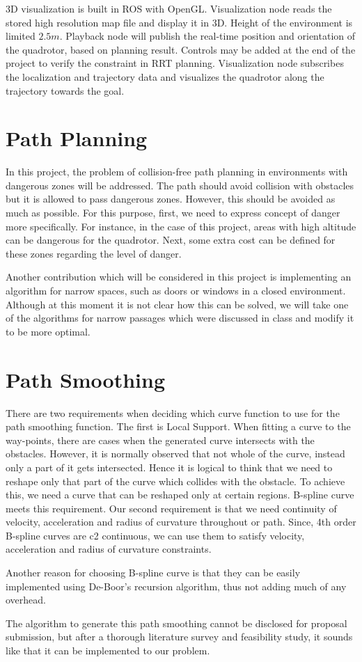 \documentclass[dvips,12pt]{article}
\begin{document}
3D visualization is built in ROS with OpenGL. Visualization node reads the stored high resolution map file and display it in 3D. Height of the environment is limited $2.5m$. Playback node will publish the real-time position and orientation of the quadrotor, based on planning result. Controls may be added at the end of the project to verify the constraint in RRT planning. Visualization node subscribes the localization and trajectory data and visualizes the quadrotor along the trajectory towards the goal.

\section{Path Planning}
In this project, the problem of collision-free path planning in environments with dangerous zones will be addressed. The path should avoid collision with obstacles but it is allowed to pass dangerous zones. However, this should be avoided as much as possible. For this purpose, first, we need to express concept of danger more specifically. For instance, in the case of this project, areas with high altitude can be dangerous for the quadrotor.  Next, some extra cost can be defined for these zones regarding the level of danger.

Another contribution which will be considered in this project is implementing an algorithm for narrow spaces, such as doors or windows in a closed environment. Although at this moment it is not clear how this can be solved, we will take one of the algorithms for narrow passages which were discussed in class and modify it to be more optimal.


\section{Path Smoothing}

There are two requirements when deciding which curve function to use for the path smoothing function. The first is Local Support. When fitting a curve to the way-points, there are cases when the generated curve intersects with the obstacles. However, it is normally observed that not whole of the curve, instead only a part of it gets intersected. Hence it is logical to think that we need to reshape only that part of the curve which collides with the obstacle. To achieve this, we need a curve that can be reshaped only at certain regions. B-spline curve meets this requirement. Our second requirement is that we need continuity of velocity, acceleration and radius of curvature throughout or path. Since, 4th order B-spline curves are c2 continuous, we can use them to satisfy velocity, acceleration and radius of curvature constraints. 

Another reason for choosing B-spline curve is that they can be easily implemented using De-Boor’s recursion algorithm, thus not adding much of any overhead. 

The algorithm to generate this path smoothing cannot be disclosed for proposal submission, but after a thorough literature survey and feasibility study, it sounds like that it can be implemented to our problem.
\end{document}
